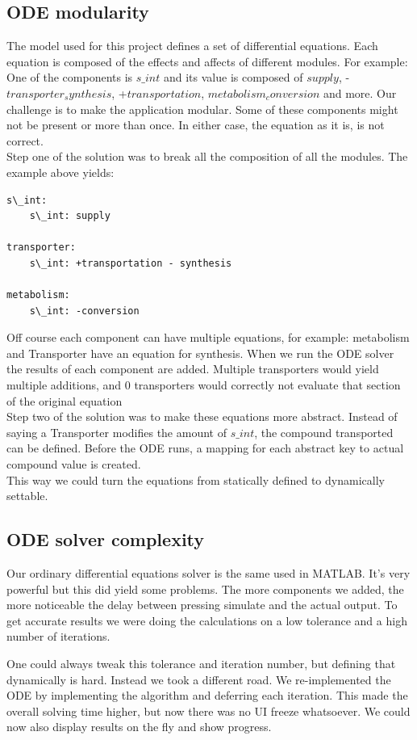 \documentclass[10pt,a4paper]{report}
\begin{document}
		\subsection{ODE modularity}
			The model used for this project defines a set of differential equations. Each equation is composed of the effects and affects of different modules. For example: One of the components is $s\_int$ and its value is composed of $supply$, -$transporter_synthesis$, +$transportation$, $metabolism_conversion$ and more. Our challenge is to make the application modular. Some of these components might not be present or more than once. In either case, the equation as it is, is not correct.\\
			Step one of the solution was to break all the composition of all the modules. The example above yields:
			\begin{lstlisting}
s\_int: 
	s\_int: supply

transporter:
	s\_int: +transportation - synthesis
	
metabolism:
	s\_int: -conversion
			\end{lstlisting}
			Off course each component can have multiple equations, for example: metabolism and Transporter have an equation for synthesis. When we run the ODE solver the results of each component are added. Multiple transporters would yield multiple additions, and 0 transporters would correctly not evaluate that section of the original equation\\
			Step two of the solution was to make these equations more abstract. Instead of saying a Transporter modifies the amount of $s\_int$, the compound transported can be defined. Before the ODE runs, a mapping for each abstract key to actual compound value is created. \\
			This way we could turn the equations from statically defined to dynamically settable.
			
		\subsection{ODE solver complexity}
			Our ordinary differential equations solver is the same used in MATLAB. It's very powerful but this did yield some problems. The more components we added, the more noticeable the delay between pressing simulate and the actual output. To get accurate results we were doing the calculations on a low tolerance and a high number of iterations.
			
			One could always tweak this tolerance and iteration number, but defining that dynamically is hard. Instead we took a different road. We re-implemented the ODE by implementing the algorithm and deferring each iteration. This made the overall solving time higher, but now there was no UI freeze whatsoever. We could now also display results on the fly and show progress.
			
\end{document}
